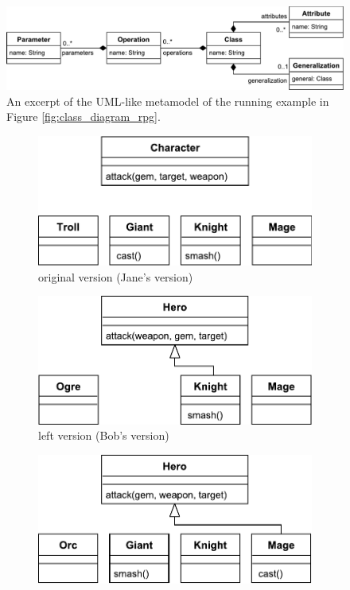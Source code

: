 \begin{figure}[]
\centering
\includegraphics[width=0.7\linewidth]{miniuml_metamodel}
\caption{An excerpt of the UML-like metamodel of the running example in Figure \ref{fig:class_diagram_rpg}.}
\label{fig:miniuml_metamodel}
\end{figure}

\begin{figure}[]
\centering
\begin{subfigure}[t]{0.31\linewidth}
\includegraphics[width=\linewidth]{class_diagram_origin}
\caption{original version (Jane's version)}
\label{fig:class_diagram_origin}
\end{subfigure}
\hfill
\begin{subfigure}[t]{0.31\linewidth}
\includegraphics[width=\linewidth]{class_diagram_left}
\caption{left version (Bob's version)}
\label{fig:class_diagram_left}
\end{subfigure}
\hfill
\begin{subfigure}[t]{0.31\linewidth}
\includegraphics[width=\linewidth]{class_diagram_right}

\end{subfigure}
\end{figure}
